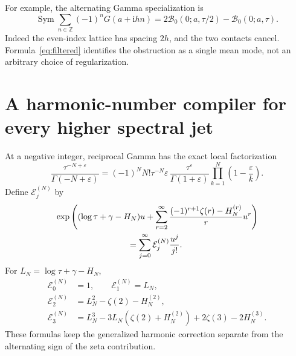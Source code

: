 \documentclass[11pt,a4paper]{article}
\numberwithin{equation}{section}
\theoremstyle{definition}
\theoremstyle{remark}
\DeclareMathOperator{\Sym}{Sym}
\newcommand{\ii}{\mathrm i}
\newcommand{\Z}{\mathbb Z}
\newcommand{\eps}{\varepsilon}
\newcommand{\Bcal}{\mathcal B}
\newcommand{\Ecal}{\mathcal E}
\begin{document}
For example, the alternating Gamma specialization is
\begin{equation}\label{eq:alternating-Gamma}
 \Sym\sum_{n\in\Z}(-1)^nG(a+\ii hn)
      =2\Bcal_0(0;a,\tau/2)-\Bcal_0(0;a,\tau).
\end{equation}
Indeed the even-index lattice has spacing $2h$, and the two contacts
cancel. Formula~\eqref{eq:filtered} identifies the obstruction as a
single mean mode, not an arbitrary choice of regularization.

\section{A harmonic-number compiler for every higher spectral jet}
\label{sec:all-jets}

At a negative integer, reciprocal Gamma has the exact local factorization
\begin{equation}\label{eq:rgamma-factor}
 \frac{\tau^{-N+\eps}}{\Gamma(-N+\eps)}
 =(-1)^N N!\tau^{-N}\eps\,
   \frac{\tau^\eps}{\Gamma(1+\eps)}
   \prod_{k=1}^N\left(1-\frac\eps k\right).
\end{equation}
Define $\Ecal_j^{(N)}$ by
\begin{equation}\label{eq:EN}
 \begin{split}
 &\exp\left((\log\tau+\gamma-H_N)u
   +\sum_{r=2}^\infty
     \frac{(-1)^{r+1}\zeta(r)-H_N^{(r)}}r u^r\right)\\
 &\hspace{30mm}=\sum_{j=0}^\infty\Ecal_j^{(N)}\frac{u^j}{j!}.
 \end{split}
\end{equation}
For $L_N=\log\tau+\gamma-H_N$,
\begin{align*}
 \Ecal_0^{(N)}&=1,\qquad \Ecal_1^{(N)}=L_N,\\
 \Ecal_2^{(N)}&=L_N^2-\zeta(2)-H_N^{(2)},\\
 \Ecal_3^{(N)}&=L_N^3-3L_N(\zeta(2)+H_N^{(2)})
                         +2\zeta(3)-2H_N^{(3)}.
\end{align*}
These formulas keep the generalized harmonic correction separate from
the alternating sign of the zeta contribution.
\end{document}
